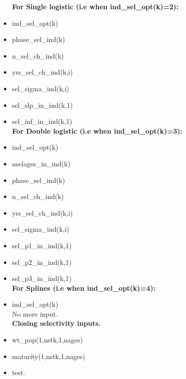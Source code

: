 \documentclass{article}
\begin{document}
\begin{itemize}
    \textbf{For Single logistic 
 (i.e when ind\_sel\_opt(k)=2):}\\
    \item ind\_sel\_opt(k)
    \item phase\_sel\_ind(k)
    \item n\_sel\_ch\_ind(k)
    \item yrs\_sel\_ch\_ind(k,i)
    \item sel\_sigma\_ind(k,i)
    \item sel\_slp\_in\_ind(k,1)
    \item sel\_inf\_in\_ind(k,1)\\
    
    \textbf{For Double logistic 
 (i.e when ind\_sel\_opt(k)=3):}\\
    \item ind\_sel\_opt(k)
    \item nselages\_in\_ind(k)
    \item phase\_sel\_ind(k)
    \item n\_sel\_ch\_ind(k)
    \item yrs\_sel\_ch\_ind(k,i)
    \item sel\_sigma\_ind(k,i)
    \item sel\_p1\_in\_ind(k,1)
    \item sel\_p2\_in\_ind(k,1)
    \item sel\_p3\_in\_ind(k,1)\\
    
     \textbf{For Splines (i.e when ind\_sel\_opt(k)=4):}\\
    \item ind\_sel\_opt(k)\\
    
    No more input.\\

    \textbf{Closing selectivity inputs.}
    \item wt\_pop(1,nstk,1,nages)
    \item maturity(1,nstk,1,nages)
    \item test.
    
 


    
\end{itemize}

\end{document}
